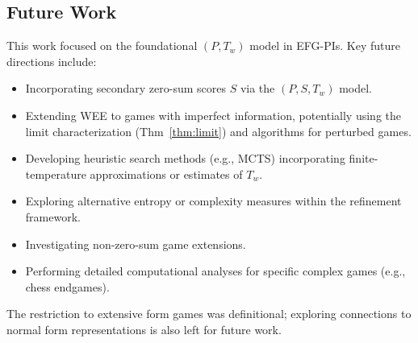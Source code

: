 \documentclass{article}
\begin{document}
\subsection{Future Work}
This work focused on the foundational $(P, T_w)$ model in EFG-PIs. Key future directions include:
\begin{itemize}
    \item Incorporating secondary zero-sum scores $S$ via the $(P, S, T_w)$ model.
    \item Extending WEE to games with imperfect information, potentially using the limit characterization (Thm~\ref{thm:limit}) and algorithms for perturbed games.
    \item Developing heuristic search methods (e.g., MCTS) incorporating finite-temperature approximations or estimates of $T_w$.
    \item Exploring alternative entropy or complexity measures within the refinement framework.
    \item Investigating non-zero-sum game extensions.
    \item Performing detailed computational analyses for specific complex games (e.g., chess endgames).
\end{itemize}
The restriction to extensive form games was definitional; exploring connections to normal form representations is also left for future work.
\end{document}
